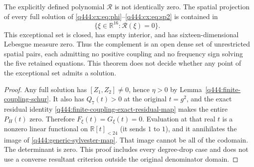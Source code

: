 \begin{theorem}
\label{q444:generic-projection-obstruction}
The explicitly defined polynomial $\mathscr R$ is not identically
zero. The spatial projection of every full solution of
\eqref{q444:cx:eq:phi}--\eqref{q444:cx:eq:sp2} is contained in
\[
 \{\xi\in\mathbb R^{16}:\mathscr R(\xi)=0\}.
\]
This exceptional set is closed, has empty interior, and has
sixteen-dimensional Lebesgue measure zero. Thus the complement is an
open dense set of unrestricted spatial pairs, each admitting no positive
coupling and no frequency sign solving the five retained equations.
This theorem does not decide whether any point of the exceptional set
admits a solution.
\end{theorem}
\begin{proof}
Any full solution has $[Z_1,Z_2]\ne0$, hence $\eta>0$ by
Lemma~\ref{q444:finite-coupling-schur}. It also has $Q_7(t)>0$ at
the original $t=g^2$, and the exact residual identity
\eqref{q444:finite-coupling-exact-residual-map} makes the entire
$P_H(t)$ zero. Therefore $F_\xi(t)=G_\xi(t)=0$. Evaluation at
that real $t$ is a nonzero linear functional on
$\mathbb R[t]_{<24}$ (it sends $1$ to $1$), and it annihilates
the image of \eqref{q444:generic-sylvester-map}. That image cannot
be all of the codomain. The determinant is zero. This proof includes
every degree-drop case and does not use a converse resultant criterion
outside the original denominator domain.


\end{proof}
